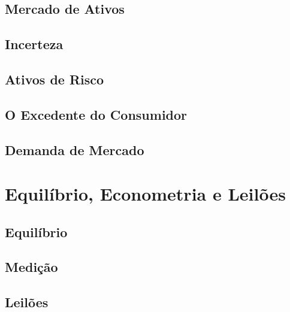 \documentclass[a4paper,11pt,oneside]{book}
\theoremstyle{definition}
\theoremstyle{break}
\begin{document}
\chapter{Mercado de Ativos}

\chapter{Incerteza}

\chapter{Ativos de Risco}

\chapter{O Excedente do Consumidor}

\chapter{Demanda de Mercado}

\part{Equilíbrio, Econometria e Leilões}

\chapter{Equilíbrio}

\chapter{Medição}

\chapter{Leilões}

\end{document}
